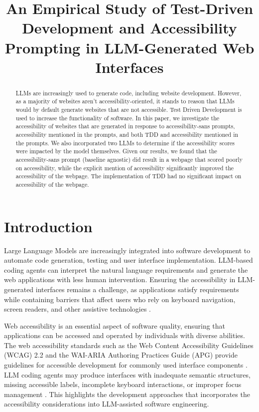 \documentclass[conference]{IEEEtran}
\title{An Empirical Study of Test-Driven Development and Accessibility Prompting in LLM-Generated Web Interfaces}
\author{
  \IEEEauthorblockN{Josbel Luna, Kaparthini Reshmi, Onesh Punchinilame}
  \IEEEauthorblockA{Department of Electrical and Computer Engineering\\
  University of Alberta}
}
\begin{document}
\maketitle

\begin{abstract}
  LLMs are increasingly used to generate code, including website development. However, as a majority of websites aren't
  accessibility-oriented, it stands to reason that LLMs would by default generate websites that are not accessible. 
  Test Driven Development is used to increase the functionality of software. In this paper, we investigate the accessibility
  of websites that are generated in response to accessibility-sans prompts, accessibility mentioned in the prompts, and both
  TDD and accessibility mentioned in the prompts. We also incorporated two LLMs to determine if the accessibility scores
  were impacted by the model themselves. Given our results, we found that the accessibility-sans prompt (baseline agnostic) 
  did result in a webpage that scored poorly on accessibility, while the explicit mention of accessibility significantly
  improved the accessibility of the webpage. The implementation of TDD had no significant impact on accessibility of the 
  webpage. 

\end{abstract}

\section{Introduction}

Large Language Models are increasingly integrated into software development to automate code generation, testing and user interface implementation. LLM-based coding agents can interpret the natural language requirements and generate the web applications with less human intervention. Ensuring the accessibility in LLM-generated interfaces remains a challenge, as applications satisfy requirements while containing barriers that affect users who rely on keyboard navigation, screen readers, and other assistive technologies \cite{aljedaani2024}. 

Web accessibility is an essential aspect of software quality, ensuring that applications can be accessed and operated by individuals with diverse abilities. The web accessibility standards such as the Web Content Accessibility Guidelines (WCAG) 2.2 and the WAI-ARIA Authoring Practices Guide (APG) provide guidelines for accessible development for commonly used interface components \cite{wcag2022,apg2026}. LLM coding agents may produce interfaces with inadequate semantic structures, missing accessible labels, incomplete keyboard interactions, or improper focus management \cite{aljedaani2024,gurita2025}. This highlights the development approaches that incorporates the accessibility considerations into LLM-assisted software engineering.
\end{document}
